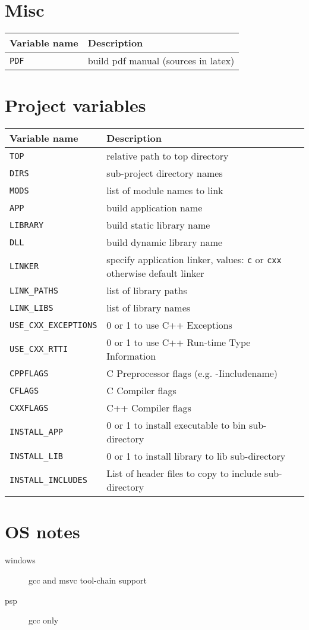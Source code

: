 \documentclass{article}
\newcommand{\var}[1]{{\tt #1}}
\newcommand{\val}[1]{{\tt #1}}
\begin{document}
\section{Misc}

\begin{tabular}{ll}
Variable name		& Description		\\
\hline
\var{PDF}		& build pdf manual (sources in latex) \\
\end{tabular}

\section{Project variables}

\begin{tabular}{ll}
Variable name            & Description                       \\
\hline
\var{TOP}		 & relative path to top directory    \\
\var{DIRS}		 & sub-project directory names	     \\
\var{MODS}               & list of module names to link      \\
\var{APP}                & build application name            \\
\var{LIBRARY}            & build static library name         \\
\var{DLL}                & build dynamic library name        \\
\var{LINKER}             & specify application linker, values: \val{c} or \val{cxx} otherwise default linker\\
\var{LINK\_PATHS}	 & list of library paths \\
\var{LINK\_LIBS}		 & list of library names \\
\var{USE\_CXX\_EXCEPTIONS} & 0 or 1 to use C++ Exceptions                \\
\var{USE\_CXX\_RTTI}       & 0 or 1 to use C++ Run-time Type Information \\
\var{CPPFLAGS}		   & C Preprocessor flags (e.g. -Iincludename) \\
\var{CFLAGS}		& C Compiler flags \\
\var{CXXFLAGS}		& C++ Compiler flags \\
\var{INSTALL\_APP}	& 0 or 1 to install executable to bin sub-directory \\
\var{INSTALL\_LIB}	& 0 or 1 to install library to lib sub-directory \\
\var{INSTALL\_INCLUDES} & List of header files to copy to include sub-directory \\
\end{tabular}

\section{OS notes}

\begin{description}
\item [windows] gcc and msvc tool-chain support
\item [psp] gcc only
\end{description}
\end{document}

